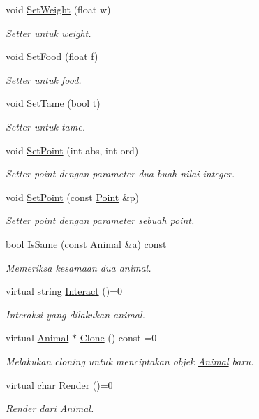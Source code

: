 \begin{DoxyCompactItemize}
void \hyperlink{classAnimal_a255a8ea15491f55565d0ee0db4f40f66}{Set\+Weight} (float w)
\begin{DoxyCompactList}\small\item\em Setter untuk weight. \end{DoxyCompactList}\item 
void \hyperlink{classAnimal_a71051747b69f2747b5262491483e8662}{Set\+Food} (float f)
\begin{DoxyCompactList}\small\item\em Setter untuk food. \end{DoxyCompactList}\item 
void \hyperlink{classAnimal_ad3a24c661579fc5caf63ecf8fc48cf4f}{Set\+Tame} (bool t)
\begin{DoxyCompactList}\small\item\em Setter untuk tame. \end{DoxyCompactList}\item 
void \hyperlink{classAnimal_a754c7eb7a8ca6d8bd3e30650546a410d}{Set\+Point} (int abs, int ord)
\begin{DoxyCompactList}\small\item\em Setter point dengan parameter dua buah nilai integer. \end{DoxyCompactList}\item 
void \hyperlink{classAnimal_a02e187a6407bc83c46698544c912be15}{Set\+Point} (const \hyperlink{classPoint}{Point} \&p)
\begin{DoxyCompactList}\small\item\em Setter point dengan parameter sebuah point. \end{DoxyCompactList}\item 
bool \hyperlink{classAnimal_afc66abcbc6efb71c81d5306ea368cffb}{Is\+Same} (const \hyperlink{classAnimal}{Animal} \&a) const 
\begin{DoxyCompactList}\small\item\em Memeriksa kesamaan dua animal. \end{DoxyCompactList}\item 
virtual string \hyperlink{classAnimal_ad5a55fb0355a9425fee6611003d9892c}{Interact} ()=0
\begin{DoxyCompactList}\small\item\em Interaksi yang dilakukan animal. \end{DoxyCompactList}\item 
virtual \hyperlink{classAnimal}{Animal} $\ast$ \hyperlink{classAnimal_a3fc95e2a588b653b9b315e6c7a29c89f}{Clone} () const =0
\begin{DoxyCompactList}\small\item\em Melakukan cloning untuk menciptakan objek \hyperlink{classAnimal}{Animal} baru. \end{DoxyCompactList}\item 
virtual char \hyperlink{classAnimal_a43a47c0f41d211128e04abc6add53def}{Render} ()=0
\begin{DoxyCompactList}\small\item\em Render dari \hyperlink{classAnimal}{Animal}. \end{DoxyCompactList}\end{DoxyCompactItemize}

